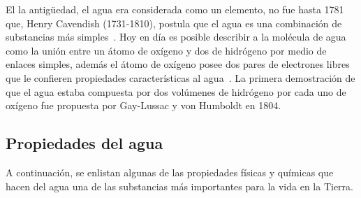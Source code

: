 El la antigüedad, el agua era considerada como un elemento, no fue hasta 1781
que, Henry Cavendish (1731-1810), postula que el agua es una combinación de
substancias más simples~\cite{sanchez2006revolucion}. Hoy en día es posible
describir a la molécula de agua como la unión entre un átomo de oxígeno y dos
de hidrógeno por medio de enlaces simples, además el átomo de oxígeno posee dos
pares de electrones libres que le confieren propiedades características al
agua~\cite{biology}. La primera demostración de que el agua estaba compuesta
por dos volúmenes de hidrógeno por cada uno de oxígeno fue propuesta por
Gay-Lussac y von Humboldt en 1804. 

\subsection{Propiedades del agua}

A continuación, se enlistan algunas de las propiedades físicas y químicas
que hacen del agua una de las substancias más importantes para la
vida en la Tierra.

